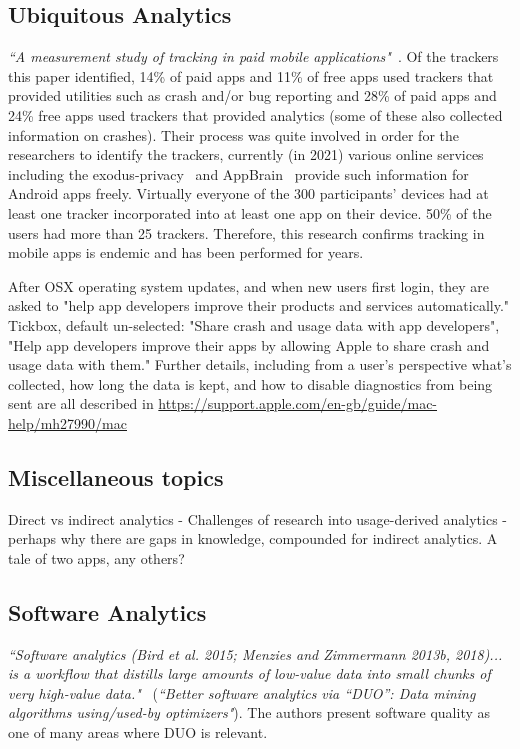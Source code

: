 \subsection{Ubiquitous Analytics}
\emph{``A measurement study of tracking in paid mobile applications"}~\cite{seneviratne2015_a_measurement_study_of_tracking_in_paid_mobile_apps}. Of the trackers this paper identified, 14\% of paid apps and 11\% of free apps used trackers that provided utilities such as crash and/or bug reporting and 28\% of paid apps and 24\% free apps used trackers that provided analytics (some of these also collected information on crashes). Their process was quite involved in order for the researchers to identify the trackers, currently (in 2021) various online services including the exodus-privacy~\cite{exodus_privacy_project} and AppBrain~\cite{appbrain} provide such information for Android apps freely. Virtually everyone of the 300 participants' devices had at least one tracker incorporated into at least one app on their device. 50\% of the users had more than 25 trackers. Therefore, this research confirms tracking in mobile apps is endemic and has been performed for years. 
 
After OSX operating system updates, and when new users first login, they are asked to "help app developers improve their products and services automatically." Tickbox, default un-selected: "Share crash and usage data with app developers", "Help app developers improve their apps by allowing Apple to share crash and usage data with them." Further details, including from a user's perspective what's collected, how long the data is kept, and how to disable diagnostics from being sent are all described in \url{https://support.apple.com/en-gb/guide/mac-help/mh27990/mac}


\subsection{Miscellaneous topics}

Direct vs indirect analytics - 
Challenges of research into usage-derived analytics - perhaps why there are gaps in knowledge, compounded for indirect analytics. A tale of two apps, any others?

\subsection{Software Analytics}
\emph{``Software analytics (Bird et al. 2015; Menzies and Zimmermann 2013b, 2018)... is a workflow that distills large amounts of low-value data into small chunks of very high-value data."}~\cite[page 2110]{agrawal2020_better_software_analytics_via_duo} (\emph{``Better software analytics via “DUO”: Data mining algorithms using/used-by optimizers"}). The authors present software quality as one of many areas where DUO is relevant. %

